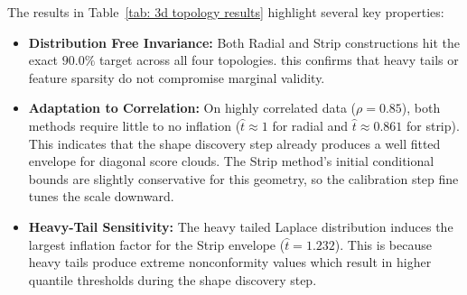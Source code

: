 The results in Table~\ref{tab: 3d topology results} highlight several key properties:
\begin{itemize}
    \item \textbf{Distribution Free Invariance:} Both Radial and Strip constructions hit the exact $90.0\%$ target across 
           all four topologies. this confirms that heavy tails or feature sparsity do not compromise marginal validity.
    \item \textbf{Adaptation to Correlation:} On highly correlated data ($\rho = 0.85$), both methods require little to no 
          inflation ($\hat t \approx 1$ for radial and $\hat t \approx 0.861$ for strip). This indicates that the shape 
          discovery step already produces a well fitted envelope for diagonal score clouds. The Strip method's initial 
          conditional bounds are slightly conservative for this geometry, so the calibration step fine tunes the 
          scale downward.
    \item \textbf{Heavy-Tail Sensitivity:} The heavy tailed Laplace distribution induces the largest inflation factor for 
           the Strip envelope ($\hat{t} = 1.232$). This is because heavy tails produce extreme nonconformity values which 
           result in higher quantile thresholds during the shape discovery step.
\end{itemize}









